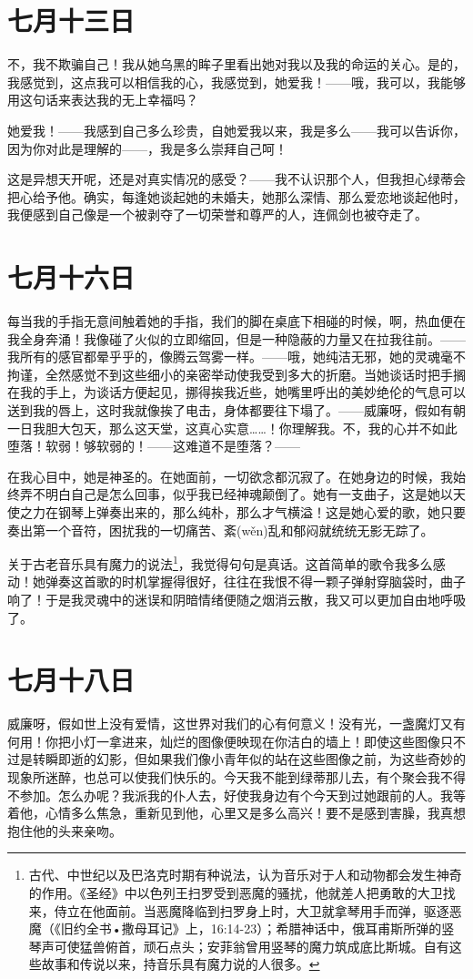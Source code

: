 \documentclass[12pt,oneside]{book}
\begin{document}
\chapter{七月十三日}
不，我不欺骗自己！我从她乌黑的眸子里看出她对我以及我的命运的关心。是的，我感觉到，这点我可以相信我的心，我感觉到，她爱我！——哦，我可以，我能够用这句话来表达我的无上幸福吗？

她爱我！——我感到自己多么珍贵，自她爱我以来，我是多么——我可以告诉你，因为你对此是理解的——，我是多么崇拜自己呵！

这是异想天开呢，还是对真实情况的感受？——我不认识那个人，但我担心绿蒂会把心给予他。确实，每逢她谈起她的未婚夫，她那么深情、那么爱恋地谈起他时，我便感到自己像是一个被剥夺了一切荣誉和尊严的人，连佩剑也被夺走了。


\chapter{七月十六日}
每当我的手指无意间触着她的手指，我们的脚在桌底下相碰的时候，啊，热血便在我全身奔涌！我像碰了火似的立即缩回，但是一种隐蔽的力量又在拉我往前。——我所有的感官都晕乎乎的，像腾云驾雾一样。——哦，她纯洁无邪，她的灵魂毫不拘谨，全然感觉不到这些细小的亲密举动使我受到多大的折磨。当她谈话时把手搁在我的手上，为谈话方便起见，挪得挨我近些，她嘴里呼出的美妙绝伦的气息可以送到我的唇上，这时我就像挨了电击，身体都要往下塌了。——威廉呀，假如有朝一日我胆大包天，那么这天堂，这真心实意……！你理解我。不，我的心并不如此堕落！软弱！够软弱的！——这难道不是堕落？——

在我心目中，她是神圣的。在她面前，一切欲念都沉寂了。在她身边的时候，我始终弄不明白自己是怎么回事，似乎我已经神魂颠倒了。她有一支曲子，这是她以天使之力在钢琴上弹奏出来的，那么纯朴，那么才气横溢！这是她心爱的歌，她只要奏出第一个音符，困扰我的一切痛苦、紊(wěn)乱和郁闷就统统无影无踪了。

关于古老音乐具有魔力的说法\footnote{古代、中世纪以及巴洛克时期有种说法，认为音乐对于人和动物都会发生神奇的作用。《圣经》中以色列王扫罗受到恶魔的骚扰，他就差人把勇敢的大卫找来，侍立在他面前。当恶魔降临到扫罗身上时，大卫就拿琴用手而弹，驱逐恶魔（《旧约全书•撒母耳记》上，16:14-23）；希腊神话中，俄耳甫斯所弹的竖琴声可使猛兽俯首，顽石点头；安菲翁曾用竖琴的魔力筑成底比斯城。自有这些故事和传说以来，持音乐具有魔力说的人很多。}，我觉得句句是真话。这首简单的歌令我多么感动！她弹奏这首歌的时机掌握得很好，往往在我恨不得一颗子弹射穿脑袋时，曲子响了！于是我灵魂中的迷误和阴暗情绪便随之烟消云散，我又可以更加自由地呼吸了。
　　
\chapter{七月十八日}
威廉呀，假如世上没有爱情，这世界对我们的心有何意义！没有光，一盏魔灯又有何用！你把小灯一拿进来，灿烂的图像便映现在你洁白的墙上！即使这些图像只不过是转瞬即逝的幻影，但如果我们像小青年似的站在这些图像之前，为这些奇妙的现象所迷醉，也总可以使我们快乐的。今天我不能到绿蒂那儿去，有个聚会我不得不参加。怎么办呢？我派我的仆人去，好使我身边有个今天到过她跟前的人。我等着他，心情多么焦急，重新见到他，心里又是多么高兴！要不是感到害臊，我真想抱住他的头来亲吻。
\end{document}

